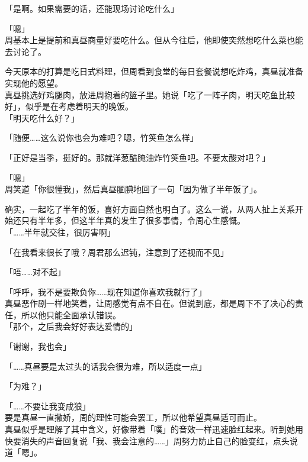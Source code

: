 「是啊。如果需要的话，还能现场讨论吃什么」

「嗯」\\

周基本上是提前和真昼商量好要吃什么。但从今往后，他即使突然想吃什么菜也能去讨论了。

今天原本的打算是吃日式料理，但周看到食堂的每日套餐说想吃炸鸡，真昼就准备实现他的愿望。\\

真昼挑选好鸡腿肉，放进周抱着的篮子里。她说「吃了一阵子肉，明天吃鱼比较好」，似乎是在考虑着明天的晚饭。\\

「明天吃什么好？」

「随便……这么说你也会为难吧？嗯，竹䇲鱼怎么样」

「正好是当季，挺好的。那就洋葱醋腌油炸竹䇲鱼吧。不要太酸对吧？」

「嗯」\\

周笑道「你很懂我」，然后真昼腼腆地回了一句「因为做了半年饭了」。

确实，一起吃了半年的饭，喜好方面自然也明白了。这么一说，从两人扯上关系开始还只有半年多，但这半年真的发生了很多事情，令周心生感慨。\\

「……半年就交往，很厉害啊」

「在我看来很长了哦？周君那么迟钝，注意到了还视而不见」

「唔……对不起」

「呼呼，我不是要欺负你……现在知道你喜欢我就行了」\\

真昼恶作剧一样地笑着，让周感觉有点不自在。但说到底，都是周下不了决心的责任，所以他只能全面承认错误。\\

「那个，之后我会好好表达爱情的」

「谢谢，我也会」

「……真昼要是太过头的话我会很为难，所以适度一点」

「为难？」

「……不要让我变成狼」\\

要是真昼一直撒娇，周的理性可能会罢工，所以他希望真昼适可而止。\\

真昼似乎是理解了其中含义，好像带着「噗」的音效一样迅速脸红起来。听到她用快要消失的声音回复说「我、我会注意的……」周努力防止自己的脸变红，点头说道「嗯」。

